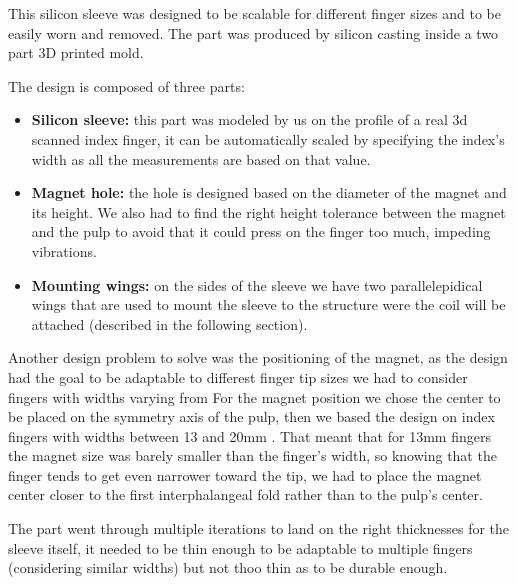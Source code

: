 This silicon sleeve was designed to be scalable for different finger sizes and to be easily worn and removed.
The part was produced by silicon casting inside a two part 3D printed mold.

The design is composed of three parts:
\begin{itemize}
    \item \textbf{Silicon sleeve: } this part was modeled by us on the profile of a real 3d scanned index finger, it can be automatically scaled by specifying the index's width as all the measurements are based on that value.
    \item \textbf{Magnet hole: } the hole is designed based on the diameter of the magnet and its height. We also had to find the right height tolerance between the magnet and the pulp to avoid that it could press on the finger too much, impeding vibrations.
    \item \textbf{Mounting wings: } on the sides of the sleeve we have two parallelepidical wings that are used to mount the sleeve to the structure were the coil will be attached (described in the following section). 
\end{itemize}

Another design problem to solve was the positioning of the magnet, as the design had the goal to be adaptable to differest finger tip sizes we had to consider fingers with widths varying from
For the magnet position we chose the center to be placed on the symmetry axis of the pulp, then we based the design on index fingers with widths between 13 and 20mm \cite{index_fingers_width}.
That meant that for 13mm fingers the magnet size was barely smaller than the finger's width, so knowing that the finger tends to get even narrower toward the tip, we had to place the magnet center closer to the first interphalangeal fold rather than to the pulp's center.

The part went through multiple iterations to land on the right thicknesses for the sleeve itself, it needed to be thin enough to be adaptable to multiple fingers (considering similar widths) but not thoo thin as to be durable enough. 

